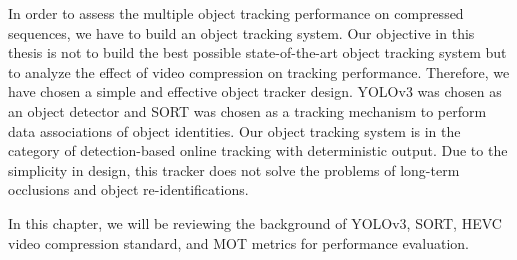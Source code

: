 
In order to assess the multiple object tracking performance on compressed sequences, we have to build an object tracking system. Our objective in this thesis is not to build the best possible state-of-the-art object tracking system but to analyze the effect of video compression on tracking performance. Therefore, we have chosen a simple and effective object tracker design. YOLOv3 \cite{redmon_yolov3_2018} was chosen as an object detector and SORT \cite{bewley_simple_2016} was chosen as a tracking mechanism to perform data associations of object identities. Our object tracking system is in the category of detection-based online tracking with deterministic output. Due to the simplicity in design, this tracker does not solve the problems of long-term occlusions and object re-identifications.

In this chapter, we will be reviewing the background of YOLOv3, SORT, HEVC video compression standard, and MOT metrics for performance evaluation.